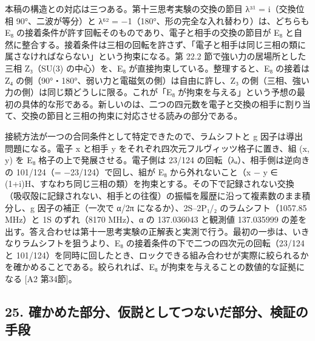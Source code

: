 \documentclass[
  a4paper,
]{ltjsarticle}
\begin{document}
本稿の構造との対応は三つある。第十三思考実験の交換の節目 λ³¹ =
i（交換位相 90°、二波が等分）と λ⁶² =
−1（180°、形の完全な入れ替わり）は、どちらも E₈
の接着条件が許す回転そのものであり、電子と相手の交換の節目が E₈
と自然に整合する。接着条件は三相の回転を許さず、「電子と相手は同じ三相の類に属さなければならない」という拘束になる。第
22.2 節で強い力の居場所とした三相 Z₃（SU(3) の中心）を、E₈
が直接拘束している。整理すると、E₈ の接着は Z₄
の側（90°・180°、弱い力と電磁気の側）は自由に許し、Z₃
の側（三相、強い力の側）は同じ類どうしに限る。これが「E₈
が拘束を与える」という予想の最初の具体的な形である。新しいのは、二つの四元数を電子と交換の相手に割り当て、交換の節目と三相の拘束に対応させる読みの部分である。

接続方法が一つの合同条件として特定できたので、ラムシフトと g
因子は導出問題になる。電子 x と相手 y
をそれぞれ四次元フルヴィッツ格子に置き、組 (x, y) を E₈
格子の上で発展させる。電子側は 23/124 の回転（λₐ）、相手側は逆向きの
101/124（= −23/124）で回し、組が E₈ から外れないこと（x − y ∈
(1+i)H、すなわち同じ三相の類）を拘束とする。その下で記録されない交換（吸収殻に記録されない、相手との往復）の振幅を履歴に沿って複素数のまま積分し、g
因子の補正（一次で α/2π になるか）、2S--2P₁/₂ のラムシフト（1057.85
MHz）と 1S のずれ（8170 MHz）、α の 137.036043 と観測値 137.035999
の差を出す。答え合わせは第十一思考実験の正解表と実測で行う。最初の一歩は、いきなりラムシフトを狙うより、E₈
の接着条件の下で二つの四次元の回転（23/124 と
101/124）を同時に回したとき、ロックできる組み合わせが実際に絞られるかを確かめることである。絞られれば、E₈
が拘束を与えることの数値的な証拠になる {[}A2 第34節{]}。

\subsection{25.
確かめた部分、仮説としてつないだ部分、検証の手段}\label{ux78baux304bux3081ux305fux90e8ux5206ux4eeeux8aacux3068ux3057ux3066ux3064ux306aux3044ux3060ux90e8ux5206ux691cux8a3cux306eux624bux6bb5}
\end{document}
